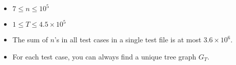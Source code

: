 \begin{itemize}
    \tightlist
    \item $7 \le n \le 10^5$
    \item $1 \le T \le 4.5\times 10^5$
    \item The sum of $n$'s in all test cases in a single test file is at most $3.6\times 10^6$. 
    \item For each test case, you can always find a unique tree graph $G_T$.
\end{itemize}
